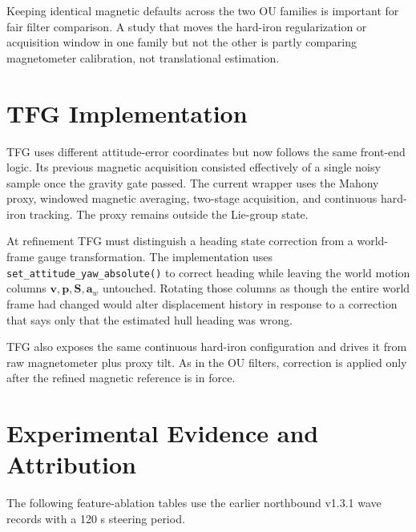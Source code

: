 \documentclass[conference]{IEEEtran}
\DeclareRobustCommand{\vct}[1]{\bm{#1}}
\begin{document}
Keeping identical magnetic defaults across the two OU families is important for fair
filter comparison.  A study that moves the hard-iron regularization or acquisition
window in one family but not the other is partly comparing magnetometer calibration,
not translational estimation.

\section{TFG Implementation}
\label{sec:tfg}

TFG uses different attitude-error coordinates but now follows the same front-end
logic.  Its previous magnetic acquisition consisted effectively of a single noisy
sample once the gravity gate passed.  The current wrapper uses the Mahony proxy,
windowed magnetic averaging, two-stage acquisition, and continuous hard-iron tracking.
The proxy remains outside the Lie-group state.

At refinement TFG must distinguish a heading state correction from a world-frame gauge
transformation.  The implementation uses
\texttt{set\_attitude\_yaw\_absolute()} to correct heading while leaving the world
motion columns $\vct v,\vct p,\vct S,\vct a_w$ untouched.  Rotating those columns as
though the entire world frame had changed would alter displacement history in response
to a correction that says only that the estimated hull heading was wrong.

TFG also exposes the same continuous hard-iron configuration and drives it from raw
magnetometer plus proxy tilt.  As in the OU filters, correction is applied only after
the refined magnetic reference is in force.

\section{Experimental Evidence and Attribution}
\label{sec:results}

The following feature-ablation tables use the earlier northbound v1.3.1 wave records with a 120 s steering period.


\end{document}

